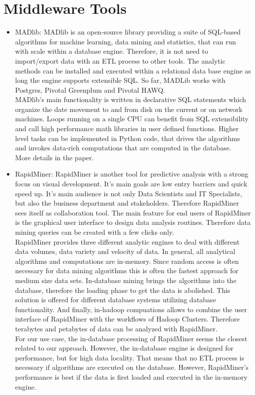 \section{Middleware Tools}
\begin{itemize}
\item MADlib: MADlib is an open-source library providing a suite of SQL-based algorithms for machine learning, data mining and statistics, that can run with scale within a database engine. Therefore, it is not need to import/export data with an ETL process to other tools. The analytic methods can be installed and executed within a relational data base engine as long the engine supports extensible SQL. So far, MADLib works with Postgres, Pivotal Greenplum and Pivotal HAWQ.
\\
MADlib's main functionality is written in declarative SQL statements which organize the date movement to and from disk on the current or on network machines. Loops running on a single CPU can benefit from SQL extensibility and call high performance math libraries in user defined functions. Higher level tasks can be implemented in Python code, that drives the algorithms and invokes data-rich computations that are computed in the database.
\\
More details in the paper.

\item RapidMiner: RapidMiner is another tool for predictive analysis with a strong focus on visual development. It's main goals are low entry barriers and quick speed up. It's main audience is not only Data Scientists and IT Specialists, but also the business department and stakeholders. Therefore RapidMiner sees itself as collaboration tool. The main feature for end users of RapidMiner is the graphical user interface to  design data analysis routines. Therefore data mining queries can be created with a few clicks only.
\\
RapidMiner provides three different analytic engines to deal with different data volumes, data variety and velocity of data. In general, all analytical algorithms and computations are in-memory. Since random access is often necessary for data mining algorithms this is often the fastest approach for medium size data sets. In-database mining brings the algorithms into the database, therefore the loading phase to get the data is abolished. This solution is offered for different database systems utilizing database functionality. And finally, in-hadoop compuations allows to combine the user interface of RapidMiner with the workflows of Hadoop Clusters. Therefore terabytes and petabytes of data can be analyzed with RapidMiner.
\\ 
For our use case, the in-database processing of RapidMiner seems the closest related to our approach. However, the in-database engine is designed for performance, but for high data locality. That means that no ETL process is necessary if algorithms are executed on the database. However, RapidMiner's performance is best if the data is first loaded and executed in the in-memory engine.
\end{itemize}
